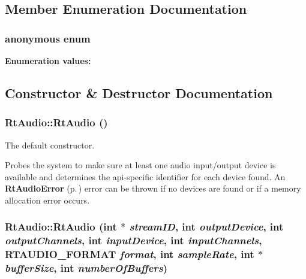 \subsection{Member Enumeration Documentation}
\subsubsection{\setlength{\rightskip}{0pt plus 5cm}anonymous enum}\label{classRtAudio_s3}


\begin{Desc}
\item[{\bf Enumeration values:}]\par
\begin{description}
\item[
{\em MAX\_\-SAMPLE\_\-RATES}\label{classRtAudio_s3s2}
]\end{description}
\end{Desc}



\subsection{Constructor \& Destructor Documentation}
\subsubsection{\setlength{\rightskip}{0pt plus 5cm}Rt\-Audio::Rt\-Audio ()}\label{classRtAudio_a0}


The default constructor.

Probes the system to make sure at least one audio input/output device is available and determines the api-specific identifier for each device found. An {\bf Rt\-Audio\-Error} {\rm (p.\,\pageref{classRtAudioError})} error can be thrown if no devices are found or if a memory allocation error occurs. 
\subsubsection{\setlength{\rightskip}{0pt plus 5cm}Rt\-Audio::Rt\-Audio (int $\ast$ {\em stream\-ID}, int {\em output\-Device}, int {\em output\-Channels}, int {\em input\-Device}, int {\em input\-Channels}, {\bf RTAUDIO\_\-FORMAT} {\em format}, int {\em sample\-Rate}, int $\ast$ {\em buffer\-Size}, int {\em number\-Of\-Buffers})}\label{classRtAudio_a1}


